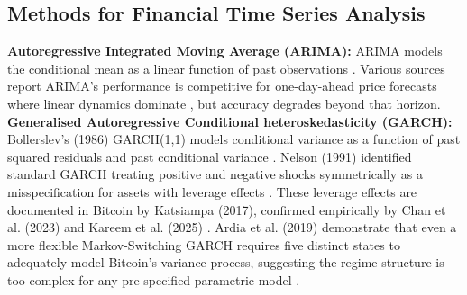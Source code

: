 \subsection{Methods for Financial Time Series Analysis}
\textbf{Autoregressive Integrated Moving Average (ARIMA):} ARIMA models the conditional mean as a linear function of past observations \cite{box1970time}. Various sources report ARIMA’s performance is competitive for one-day-ahead price forecasts where linear dynamics dominate \cite{xiaPredictionFinancialTimeseries2025,kareemBitcoinForecastingClassical2025,tangSurveyMachineLearning2022}, but accuracy degrades beyond that horizon.
\noindent \textbf{Generalised Autoregressive Conditional heteroskedasticity (GARCH):} Bollerslev's (1986) GARCH(1,1) models conditional variance as a function of past squared residuals and past conditional variance \cite{bollerslevGeneralizedAutoregressiveConditional1986}. Nelson (1991) identified standard GARCH treating positive and negative shocks symmetrically as a misspecification for assets with leverage effects \cite{nelsonConditionalHeteroskedasticityAsset1991}. 
These leverage effects are documented in Bitcoin by Katsiampa (2017), confirmed empirically by Chan et al. (2023) and Kareem et al. (2025) \cite{katsiampaVolatilityEstimationBitcoin2017, chanBitcoinHalvingCycle2023, kareemBitcoinForecastingClassical2025}.
\noindent Ardia et al. (2019) demonstrate that even a more flexible Markov-Switching GARCH requires five distinct states to adequately model Bitcoin's variance process, suggesting the regime structure is too complex for any pre-specified parametric model \cite{ardiaMarkovSwitchingGARCHModels2019}.

